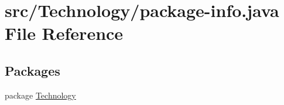 \hypertarget{_technology_2package-info_8java}{\section{src/\-Technology/package-\/info.java File Reference}
\label{_technology_2package-info_8java}
}
\subsection*{Packages}
\begin{DoxyCompactItemize}
\item 
package \hyperlink{namespace_technology}{Technology}
\end{DoxyCompactItemize}

